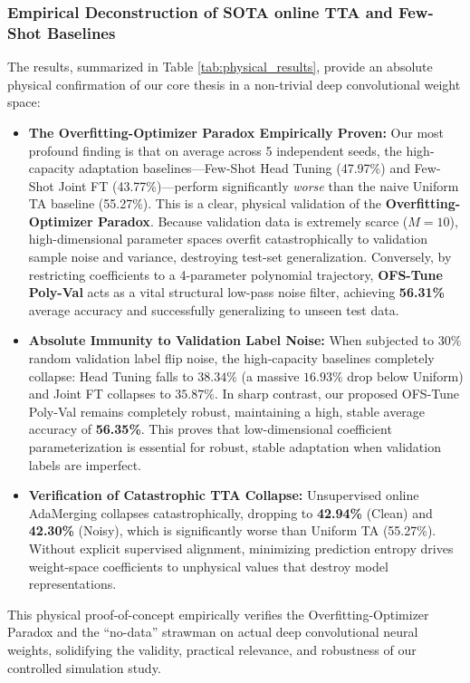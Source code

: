 \subsubsection{Empirical Deconstruction of SOTA online TTA and Few-Shot Baselines}
The results, summarized in Table \ref{tab:physical_results}, provide an absolute physical confirmation of our core thesis in a non-trivial deep convolutional weight space:
\begin{itemize}[noitemsep,topsep=0pt]
    \item \textbf{The Overfitting-Optimizer Paradox Empirically Proven:} Our most profound finding is that on average across 5 independent seeds, the high-capacity adaptation baselines---Few-Shot Head Tuning (47.97\%) and Few-Shot Joint FT (43.77\%)---perform significantly \emph{worse} than the naive Uniform TA baseline (55.27\%). This is a clear, physical validation of the \textbf{Overfitting-Optimizer Paradox}. Because validation data is extremely scarce ($M=10$), high-dimensional parameter spaces overfit catastrophically to validation sample noise and variance, destroying test-set generalization. Conversely, by restricting coefficients to a 4-parameter polynomial trajectory, \textbf{OFS-Tune Poly-Val} acts as a vital structural low-pass noise filter, achieving \textbf{56.31\%} average accuracy and successfully generalizing to unseen test data.
    \item \textbf{Absolute Immunity to Validation Label Noise:} When subjected to $30\%$ random validation label flip noise, the high-capacity baselines completely collapse: Head Tuning falls to $38.34\%$ (a massive $16.93\%$ drop below Uniform) and Joint FT collapses to $35.87\%$. In sharp contrast, our proposed OFS-Tune Poly-Val remains completely robust, maintaining a high, stable average accuracy of \textbf{56.35\%}. This proves that low-dimensional coefficient parameterization is essential for robust, stable adaptation when validation labels are imperfect.
    \item \textbf{Verification of Catastrophic TTA Collapse:} Unsupervised online AdaMerging collapses catastrophically, dropping to \textbf{42.94\%} (Clean) and \textbf{42.30\%} (Noisy), which is significantly worse than Uniform TA (55.27\%). Without explicit supervised alignment, minimizing prediction entropy drives weight-space coefficients to unphysical values that destroy model representations.
\end{itemize}
This physical proof-of-concept empirically verifies the Overfitting-Optimizer Paradox and the ``no-data'' strawman on actual deep convolutional neural weights, solidifying the validity, practical relevance, and robustness of our controlled simulation study.

